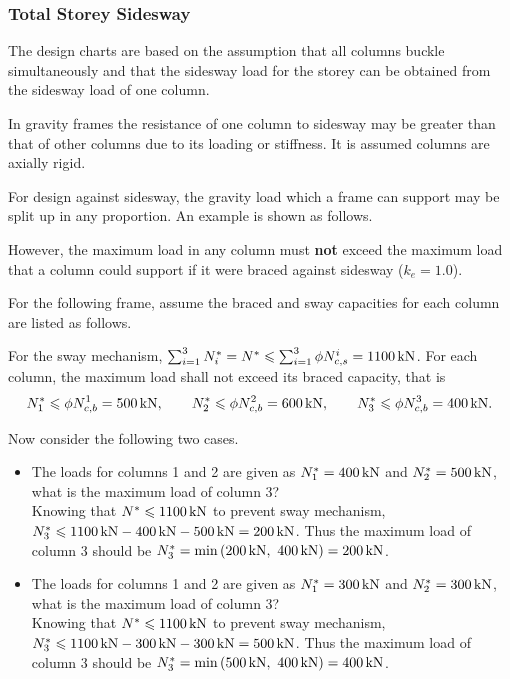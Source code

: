 \subsubsection{Total Storey Sidesway}
The design charts are based on the assumption that all columns buckle simultaneously and that the sidesway load for the storey can be obtained from the sidesway load of one column.

In gravity frames the resistance of one column to sidesway may be greater than that of other columns due to its loading or stiffness. It is assumed columns are axially rigid.

For design against sidesway, the gravity load which a frame can support may be split up in any proportion. An example is shown as follows.
\begin{figure}[H]
\centering
\end{figure}

However, the maximum load in any column must \textbf{not} exceed the maximum load that a column could support if it were braced against sidesway ($k_e=1.0$).

For the following frame, assume the braced and sway capacities for each column are listed as follows.
\begin{figure}[H]
\centering
\end{figure}
For the sway mechanism, $\sum_{i=1}^3N^*_i=N^*\leqslant\sum_{i=1}^3\phi{}N_{c,s}^i=\SI{1100}{\kilo\newton}$. For each column, the maximum load shall not exceed its braced capacity, that is
\begin{gather*}
N^*_1\leqslant\phi{}N_{c,b}^1=\SI{500}{\kilo\newton},\qquad
N^*_2\leqslant\phi{}N_{c,b}^2=\SI{600}{\kilo\newton},\qquad
N^*_3\leqslant\phi{}N_{c,b}^3=\SI{400}{\kilo\newton}.
\end{gather*}

Now consider the following two cases.
\begin{itemize}
\item The loads for columns 1 and 2 are given as $N^*_1=\SI{400}{\kilo\newton}$ and $N^*_2=\SI{500}{\kilo\newton}$, what is the maximum load of column 3?\\Knowing that $N^*\leqslant\SI{1100}{\kilo\newton}$ to prevent sway mechanism, $N^*_3\leqslant\SI{1100}{\kilo\newton}-\SI{400}{\kilo\newton}-\SI{500}{\kilo\newton}=\SI{200}{\kilo\newton}$. Thus the maximum load of column 3 should be $N^*_3=\min\left(\SI{200}{\kilo\newton},~\SI{400}{\kilo\newton}\right)=\SI{200}{\kilo\newton}$.
\item The loads for columns 1 and 2 are given as $N^*_1=\SI{300}{\kilo\newton}$ and $N^*_2=\SI{300}{\kilo\newton}$, what is the maximum load of column 3?\\Knowing that $N^*\leqslant\SI{1100}{\kilo\newton}$ to prevent sway mechanism, $N^*_3\leqslant\SI{1100}{\kilo\newton}-\SI{300}{\kilo\newton}-\SI{300}{\kilo\newton}=\SI{500}{\kilo\newton}$. Thus the maximum load of column 3 should be $N^*_3=\min\left(\SI{500}{\kilo\newton},~\SI{400}{\kilo\newton}\right)=\SI{400}{\kilo\newton}$.
\end{itemize}

